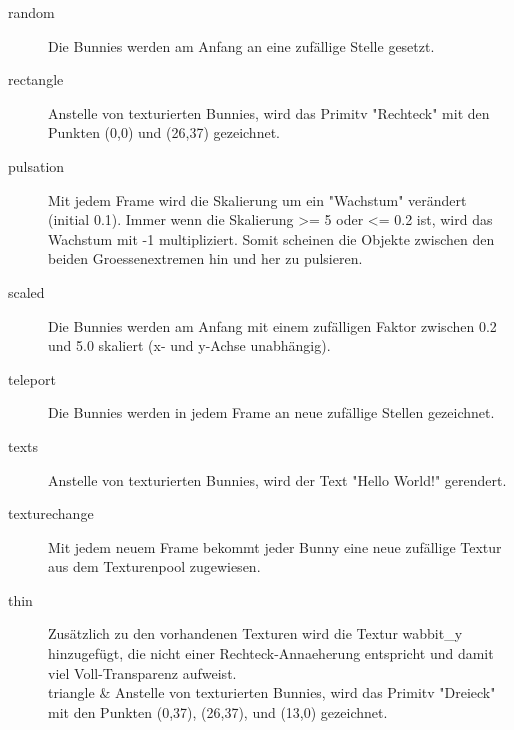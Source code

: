 \begin{description}
\item[random] Die Bunnies werden am Anfang an eine zufällige Stelle gesetzt. \\                                                                                                                                                                                                                                                                                                                                                                                
\item[rectangle] Anstelle von texturierten Bunnies, wird das Primitv "Rechteck" mit den Punkten (0,0) und (26,37) gezeichnet. \\
\item[pulsation] Mit jedem Frame wird die Skalierung um ein "Wachstum" verändert (initial 0.1). Immer wenn die Skalierung \textgreater= 5 oder \textless= 0.2 ist, wird das Wachstum mit -1 multipliziert. Somit scheinen die Objekte zwischen den beiden Groessenextremen hin und her zu pulsieren. \\
\item[scaled] Die Bunnies werden am Anfang mit einem zufälligen Faktor zwischen 0.2 und 5.0 skaliert (x- und y-Achse unabhängig). \\
\item[teleport] Die Bunnies werden in jedem Frame an neue zufällige Stellen gezeichnet. \\
\item[texts] Anstelle von texturierten Bunnies, wird der Text "Hello World!" gerendert. \\
\item[texturechange] Mit jedem neuem Frame bekommt jeder Bunny eine neue zufällige Textur aus dem Texturenpool zugewiesen. \\
\item[thin] Zusätzlich zu den vorhandenen Texturen wird die Textur wabbit\_y hinzugefügt, die nicht einer Rechteck-Annaeherung entspricht und damit viel Voll-Transparenz aufweist. \\
triangle      & Anstelle von texturierten Bunnies, wird das Primitv "Dreieck" mit den Punkten (0,37), (26,37), und (13,0) gezeichnet.                                                                                                                                                                                                                                                                                                                           \end{description}

